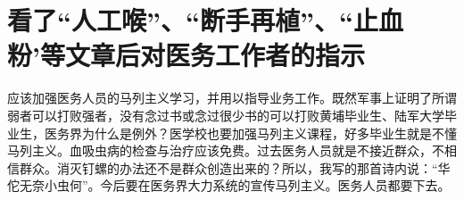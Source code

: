\section[看了“人工喉”、“断手再植”、“止血粉’等文章后对医务工作者的指示（一九六六年三月十二日）]{看了“人工喉”、“断手再植”、“止血粉’等文章后对医务工作者的指示}


应该加强医务人员的马列主义学习，并用以指导业务工作。既然军事上证明了所谓弱者可以打败强者，没有念过书或念过很少书的可以打败黄埔毕业生、陆军大学毕业生，医务界为什么是例外？医学校也要加强马列主义课程，好多毕业生就是不懂马列主义。血吸虫病的检查与治疗应该免费。过去医务人员就是不接近群众，不相信群众。消灭钉螺的办法还不是群众创造出来的？所以，我写的那首诗内说：“华佗无奈小虫何”。今后要在医务界大力系统的宣传马列主义。医务人员都要下去。


